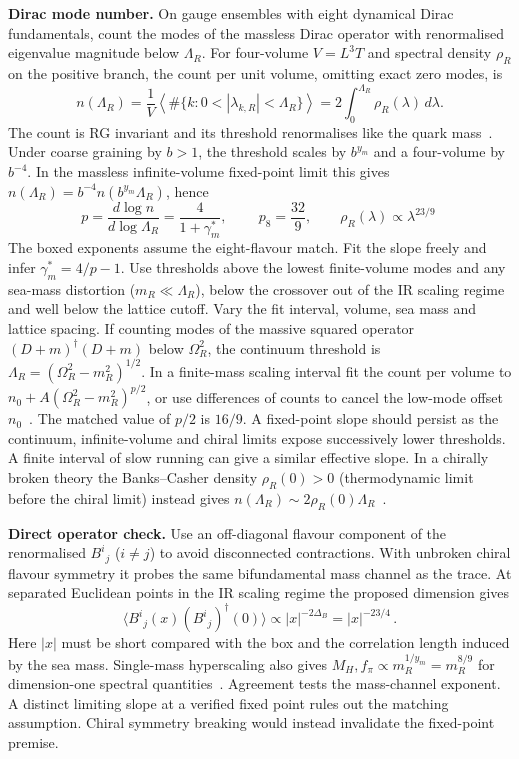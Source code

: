 \documentclass[11pt,a4paper]{article}
\theoremstyle{plain}
\theoremstyle{definition}
\theoremstyle{remark}
\begin{document}
\textbf{Dirac mode number.}  On gauge ensembles with eight dynamical
Dirac fundamentals, count the modes of the massless Dirac operator
with renormalised eigenvalue magnitude below $\Lambda_R$.  For
four-volume $V=L^3T$ and spectral density $\rho_R$ on the positive
branch, the count per unit volume, omitting exact zero modes, is
\begin{equation}\label{eq:mode-count}
 n(\Lambda_R)=\frac{1}{V}
   \left\langle\#\{k:0<|\lambda_{k,R}|<\Lambda_R\}\right\rangle
 =2\int_0^{\Lambda_R}\rho_R(\lambda)\,d\lambda .
\end{equation}
The count is RG invariant and its threshold renormalises like the
quark mass~\cite{Patella2012,Cheng2013}.  Under coarse graining by
$b>1$, the threshold scales by $b^{y_m}$ and a four-volume by $b^{-4}$.
In the massless infinite-volume fixed-point limit this gives
$n(\Lambda_R)=b^{-4}n(b^{y_m}\Lambda_R)$, hence
\begin{equation}\label{eq:mode-slope}
 p=\frac{d\log n}{d\log\Lambda_R}=\frac{4}{1+\gamma_m^*},
 \qquad
 \boxed{\ p_8=\frac{32}{9},\qquad \rho_R(\lambda)\propto\lambda^{23/9}\ }
\end{equation}
The boxed exponents assume the eight-flavour match.  Fit the slope
freely and infer $\gamma_m^*=4/p-1$.  Use thresholds
above the lowest finite-volume modes and any sea-mass distortion
($m_R\ll\Lambda_R$), below the crossover out of the IR scaling regime
and well below the lattice cutoff.  Vary the fit interval, volume,
sea mass and lattice spacing.  If counting modes of the massive
squared operator $(D+m)^\dagger(D+m)$ below $\Omega_R^2$, the
continuum threshold is $\Lambda_R=(\Omega_R^2-m_R^2)^{1/2}$.
In a finite-mass scaling interval fit the count per volume to
$n_0+A(\Omega_R^2-m_R^2)^{p/2}$, or use differences of counts to
cancel the low-mode offset $n_0$~\cite{Patella2012}.  The matched
value of $p/2$ is $16/9$.  A fixed-point slope should persist as the
continuum, infinite-volume and chiral limits expose successively lower
thresholds.  A finite
interval of slow running can give a similar effective slope.  In a
chirally broken theory the Banks--Casher density $\rho_R(0)>0$
(thermodynamic limit before the chiral limit) instead gives
$n(\Lambda_R)\sim2\rho_R(0)\Lambda_R$~\cite{BanksCasher}.

\textbf{Direct operator check.}  Use an off-diagonal flavour
component of the renormalised $B^i{}_j$ ($i\ne j$) to avoid
disconnected contractions.  With unbroken chiral flavour symmetry it
probes the same bifundamental mass channel as the trace.  At separated
Euclidean points in the IR scaling regime the proposed dimension gives
\begin{equation}\label{eq:bilinear-correlator}
  \langle B^i{}_j(x)(B^i{}_j)^\dagger(0)\rangle
     \propto |x|^{-2\Delta_B}=|x|^{-23/4}\,.
\end{equation}
Here $|x|$ must be short compared with the box and the correlation
length induced by the sea mass.  Single-mass hyperscaling also gives
$M_H,f_\pi\propto m_R^{1/y_m}=m_R^{8/9}$ for dimension-one spectral
quantities~\cite{DeGrand2015}.  Agreement tests the mass-channel
exponent.  A distinct limiting slope at a verified fixed point rules
out the matching assumption.  Chiral symmetry breaking would instead
invalidate the fixed-point premise.
\end{document}
